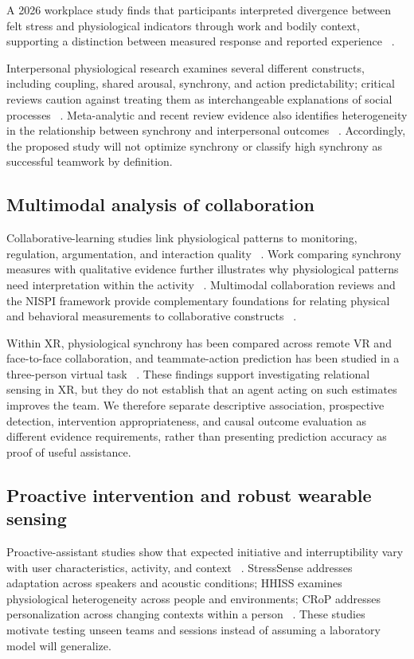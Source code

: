 A 2026 workplace study finds that participants interpreted divergence between felt stress and physiological indicators through work and bodily context, supporting a distinction between measured response and reported experience ~\cite{feeling}.

Interpersonal physiological research examines several different constructs, including coupling, shared arousal, synchrony, and action predictability; critical reviews caution against treating them as interchangeable explanations of social processes ~\cite{p32,p49}. Meta-analytic and recent review evidence also identifies heterogeneity in the relationship between synchrony and interpersonal outcomes ~\cite{p44,p23}. Accordingly, the proposed study will not optimize synchrony or classify high synchrony as successful teamwork by definition.

\subsection{Multimodal analysis of collaboration}

Collaborative-learning studies link physiological patterns to monitoring, regulation, argumentation, and interaction quality ~\cite{p25,p35,p41,p43,p47}. Work comparing synchrony measures with qualitative evidence further illustrates why physiological patterns need interpretation within the activity ~\cite{p56}. Multimodal collaboration reviews and the NISPI framework provide complementary foundations for relating physical and behavioral measurements to collaborative constructs ~\cite{p57,p14}.

Within XR, physiological synchrony has been compared across remote VR and face-to-face collaboration, and teammate-action prediction has been studied in a three-person virtual task ~\cite{p63,p52}. These findings support investigating relational sensing in XR, but they do not establish that an agent acting on such estimates improves the team. We therefore separate descriptive association, prospective detection, intervention appropriateness, and causal outcome evaluation as different evidence requirements, rather than presenting prediction accuracy as proof of useful assistance.

\subsection{Proactive intervention and robust wearable sensing}

Proactive-assistant studies show that expected initiative and interruptibility vary with user characteristics, activity, and context ~\cite{expect,speaker}. StressSense addresses adaptation across speakers and acoustic conditions; HHISS examines physiological heterogeneity across people and environments; CRoP addresses personalization across changing contexts within a person ~\cite{stresssense,hhiss,crop}. These studies motivate testing unseen teams and sessions instead of assuming a laboratory model will generalize.

